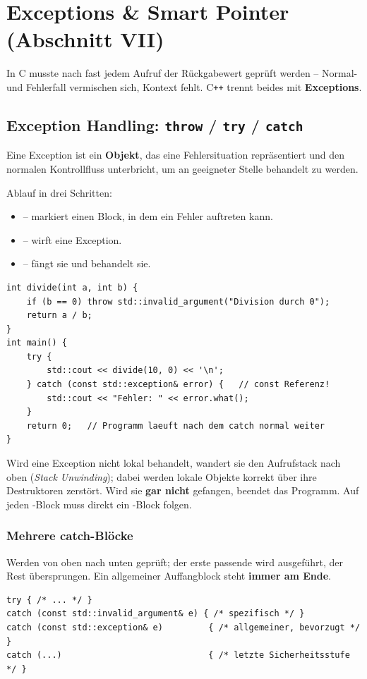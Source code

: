 \section{Exceptions \& Smart Pointer (Abschnitt VII)}
In C musste nach fast jedem Aufruf der R\"uckgabewert gepr\"uft werden -- Normal- und Fehlerfall vermischen sich, Kontext fehlt. C\texttt{++} trennt beides mit \textbf{Exceptions}.

\subsection{Exception Handling: \texttt{throw} / \texttt{try} / \texttt{catch}}
\begin{definition}[: Exception]
Eine Exception ist ein \textbf{Objekt}, das eine Fehlersituation repr\"asentiert und den normalen Kontrollfluss unterbricht, um an geeigneter Stelle behandelt zu werden.
\end{definition}
Ablauf in drei Schritten:
\begin{itemize}
  \item {} -- markiert einen Block, in dem ein Fehler auftreten kann.
  \item {} -- wirft eine Exception.
  \item {} -- f\"angt sie und behandelt sie.
\end{itemize}
\begin{lstlisting}
int divide(int a, int b) {
    if (b == 0) throw std::invalid_argument("Division durch 0");
    return a / b;
}
int main() {
    try {
        std::cout << divide(10, 0) << '\n';
    } catch (const std::exception& error) {   // const Referenz!
        std::cout << "Fehler: " << error.what();
    }
    return 0;   // Programm laeuft nach dem catch normal weiter
}
\end{lstlisting}
\begin{merke}
Wird eine Exception nicht lokal behandelt, wandert sie den Aufrufstack nach oben (\emph{Stack Unwinding}); dabei werden lokale Objekte korrekt \"uber ihre Destruktoren zerst\"ort. Wird sie \textbf{gar nicht} gefangen, beendet  das Programm. Auf jeden -Block muss direkt ein -Block folgen.
\end{merke}

\subsubsection*{Mehrere catch-Bl\"ocke}
Werden von oben nach unten gepr\"uft; der erste passende wird ausgef\"uhrt, der Rest \"ubersprungen. Ein allgemeiner Auffangblock steht \textbf{immer am Ende}.
\begin{lstlisting}
try { /* ... */ }
catch (const std::invalid_argument& e) { /* spezifisch */ }
catch (const std::exception& e)         { /* allgemeiner, bevorzugt */ }
catch (...)                             { /* letzte Sicherheitsstufe */ }
\end{lstlisting}

